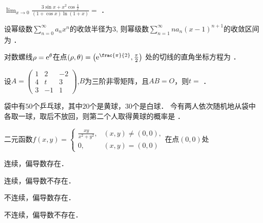 \documentclass[plain,noanswer,medmath]{../../template/jnuexam}
\begin{document}




\begin{problem}
$\lim_{x \to 0} \frac{3\sin x + x^2\cos \frac{1}{x}}{(1 + \cos x)\ln(1 + x)} =$ \fillin{}．
\end{problem}


\begin{problem}
设幂级数$\sum_{n = 0}^{\infty}a_n x^n$的收敛半径为$3$,
则幂级数$\sum_{n = 1}^{\infty}na_n (x - 1)^{n + 1}$的收敛区间为 \fillin{}．
\end{problem}


\begin{problem}
对数螺线$\rho = \mathrm{e}^{\theta}$在点$(\rho ,\theta) = \left(\e^{\frac{\pi}{2}},\tfrac{\pi}{2} \right)$
处的切线的直角坐标方程为 \fillin{}．
\end{problem}


\begin{problem}
设$A = \begin{pmatrix}
  1 &  2 & -2 \\
  4 &  t & 3 \\
  3 & -1 & 1
\end{pmatrix}$,$B$为三阶非零矩阵，且$AB = O$，则$t =$ \fillin{}．
\end{problem}


\begin{problem}
袋中有$50$个乒乓球，其中$20$个是黄球，$30$个是白球．
今有两人依次随机地从袋中各取一球，取后不放回，则第二个人取得黄球的概率是 \fillin{}．
\end{problem}




\begin{problem}
二元函数$f(x,y) = \begin{cases}
 \frac{xy}{x^2 + y^2}, & (x,y) \ne(0,0), \\
 0, & (x,y) = (0,0)
\end{cases}$在点$(0,0)$处\pickout{}
\begin{abcd}
\item 连续，偏导数存在．                
\item 连续，偏导数不存在．
\item 不连续，偏导数存在．              
\item 不连续，偏导数不存在．
\end{abcd}
\end{problem}
\end{document}
